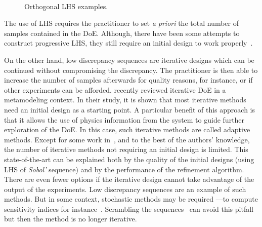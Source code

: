 \begin{figure}[!h]               
\centering
{}
 ~       
\caption{Orthogonal LHS examples.}
\label{fig:lhs}
\end{figure}

The use of LHS requires the practitioner to set \emph{a priori} the total number of samples contained in the DoE. Although, there have been some attempts to construct progressive LHS, they still require an initial design to work properly~\citep{Sheikholeslami2017}.

On the other hand, low discrepancy sequences are iterative designs which can be continued without compromising the discrepancy. The practitioner is then able to increase the number of samples afterwards for quality reasons, for instance, or if other experiments can be afforded. \citet{Liu2018} recently reviewed iterative DoE in a metamodeling context. In their study, it is shown that most iterative methods need an initial design as a starting point. A particular benefit of this approach is that it allows the use of physics information from the system to guide further exploration of the DoE. In this case, such iterative methods are called adaptive methods. Except for some work in~\citep{Crombecq2011}, and to the best of the authors’ knowledge, the number of iterative methods not requiring an initial design is limited. This state-of-the-art can be explained both by the quality of the initial designs (using LHS of \emph{Sobol'} sequence) and by the performance of the refinement algorithm. There are even fewer options if the iterative design cannot take advantage of the output of the experiments. Low discrepancy sequences are an example of such methods. But in some context, stochastic methods may be required ---\thinspace to compute sensitivity indices for instance~\citep{Saltelli2010}. Scrambling the sequences~\citep{Owen1998} can avoid this pitfall but then the method is no longer iterative.

